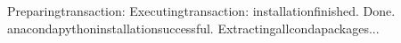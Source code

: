 \documentclass[a4paper,11pt,english]{sphinxmanual}
\begin{document}
\begin{sphinxVerbatim}[commandchars=\\\{\}]
Preparingtransaction:
Executingtransaction:
installationfinished.
\PYGZhy{}\PYGZhy{}\PYGZhy{}\PYGZhy{}\PYGZhy{}\PYGZhy{}\PYGZhy{}\PYGZhy{}\PYGZhy{}\PYGZhy{}\PYGZhy{}\PYGZhy{}\PYGZhy{}\PYGZhy{}\PYGZhy{}\PYGZhy{}\PYGZhy{}\PYGZhy{}\PYGZhy{}\PYGZhy{}\PYGZhy{}\PYGZhy{}\PYGZhy{}\PYGZhy{}\PYGZhy{}\PYGZhy{}\PYGZhy{}\PYGZhy{}\PYGZhy{}\PYGZhy{}\PYGZhy{}\PYGZhy{}\PYGZhy{}\PYGZhy{}\PYGZhy{}\PYGZhy{}\PYGZhy{}\PYGZhy{}\PYGZhy{}\PYGZhy{}\PYGZhy{}\PYGZhy{}\PYGZhy{}\PYGZhy{}\PYGZhy{}\PYGZhy{}\PYGZhy{}\PYGZhy{}\PYGZhy{}\PYGZhy{}\PYGZhy{}\PYGZhy{}\PYGZhy{}\PYGZhy{}\PYGZhy{}\PYGZhy{}\PYGZhy{}\PYGZhy{}\PYGZhy{}\PYGZhy{}\PYGZhy{}\PYGZhy{}\PYGZhy{}\PYGZhy{}\PYGZhy{}\PYGZhy{}\PYGZhy{}\PYGZhy{}\PYGZhy{}\PYGZhy{}\PYGZhy{}\PYGZhy{}
Done.
anacondapythoninstallationsuccessful.
\PYGZhy{}\PYGZhy{}\PYGZhy{}\PYGZhy{}\PYGZhy{}\PYGZhy{}\PYGZhy{}\PYGZhy{}\PYGZhy{}\PYGZhy{}\PYGZhy{}\PYGZhy{}\PYGZhy{}\PYGZhy{}\PYGZhy{}\PYGZhy{}\PYGZhy{}\PYGZhy{}\PYGZhy{}\PYGZhy{}\PYGZhy{}\PYGZhy{}\PYGZhy{}\PYGZhy{}\PYGZhy{}\PYGZhy{}\PYGZhy{}\PYGZhy{}\PYGZhy{}\PYGZhy{}\PYGZhy{}\PYGZhy{}\PYGZhy{}\PYGZhy{}\PYGZhy{}\PYGZhy{}\PYGZhy{}\PYGZhy{}\PYGZhy{}\PYGZhy{}\PYGZhy{}\PYGZhy{}\PYGZhy{}\PYGZhy{}\PYGZhy{}\PYGZhy{}\PYGZhy{}\PYGZhy{}\PYGZhy{}\PYGZhy{}\PYGZhy{}\PYGZhy{}\PYGZhy{}\PYGZhy{}\PYGZhy{}\PYGZhy{}\PYGZhy{}\PYGZhy{}\PYGZhy{}\PYGZhy{}\PYGZhy{}\PYGZhy{}\PYGZhy{}\PYGZhy{}\PYGZhy{}\PYGZhy{}\PYGZhy{}\PYGZhy{}\PYGZhy{}\PYGZhy{}\PYGZhy{}\PYGZhy{}
Extractingallcondapackages...
\PYGZhy{}\PYGZhy{}\PYGZhy{}\PYGZhy{}\PYGZhy{}\PYGZhy{}\PYGZhy{}\PYGZhy{}\PYGZhy{}\PYGZhy{}\PYGZhy{}\PYGZhy{}\PYGZhy{}\PYGZhy{}\PYGZhy{}\PYGZhy{}\PYGZhy{}\PYGZhy{}\PYGZhy{}\PYGZhy{}\PYGZhy{}\PYGZhy{}\PYGZhy{}\PYGZhy{}\PYGZhy{}\PYGZhy{}\PYGZhy{}\PYGZhy{}\PYGZhy{}\PYGZhy{}\PYGZhy{}\PYGZhy{}\PYGZhy{}\PYGZhy{}\PYGZhy{}\PYGZhy{}\PYGZhy{}\PYGZhy{}\PYGZhy{}\PYGZhy{}\PYGZhy{}\PYGZhy{}\PYGZhy{}\PYGZhy{}\PYGZhy{}\PYGZhy{}\PYGZhy{}\PYGZhy{}\PYGZhy{}\PYGZhy{}\PYGZhy{}\PYGZhy{}\PYGZhy{}\PYGZhy{}\PYGZhy{}\PYGZhy{}\PYGZhy{}\PYGZhy{}\PYGZhy{}\PYGZhy{}\PYGZhy{}\PYGZhy{}\PYGZhy{}\PYGZhy{}\PYGZhy{}\PYGZhy{}\PYGZhy{}\PYGZhy{}\PYGZhy{}\PYGZhy{}\PYGZhy{}\PYGZhy{}


\end{sphinxVerbatim}
\end{document}
